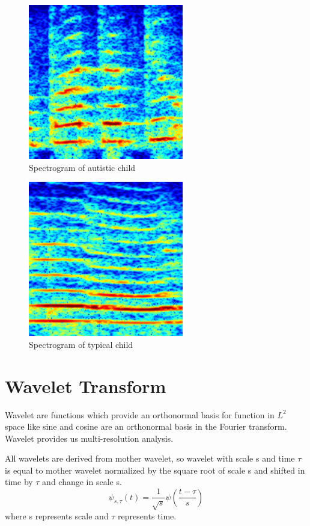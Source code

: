 \documentclass[11pt]{report}
\begin{document}
\begin{figure}[h]
\centering
\includegraphics[scale=.7]{./images/spec_asd.png}
\caption{Spectrogram of autistic child}
\end{figure}

\begin{figure}[h]
\centering
\includegraphics[scale=.7]{./images/spec_td.png}
\caption{Spectrogram of typical child}
\end{figure}


\newpage
\section{Wavelet Transform}
Wavelet are functions which provide an orthonormal basis for function in $L^2$ space like sine and cosine are an orthonormal basis in the Fourier transform. Wavelet provides us multi-resolution analysis.



All wavelets are derived from mother wavelet, so wavelet with scale s and time $\tau$ is equal to mother wavelet normalized by the square root of scale s and shifted in time by $\tau$ and change in scale s.
\begin{equation}
\psi_{s,\tau}(t)=\frac{1}{\sqrt{s}}\psi(\frac{t-\tau}{s})
\end{equation}
where s represents scale and $\tau$ represents time.
\end{document}

